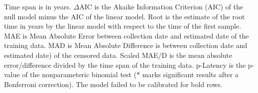 \documentclass[12pt]{article}
\begin{document}
\begin{sidewaystable}
	Time span is in years.
	$\Delta$AIC is the Akaike Information Criterion (AIC) \cite{Akaike74} of the null model minus the AIC of the linear model.
	Root is the estimate of the root time in years by the linear model with respect to the time of the first sample.
	MAE is Mean Absolute Error between collection date and estimated date of the training data.
	MAD is Mean Absolute Difference is between collection date and estimated date) of the censored data.
	Scaled MAE/D is the mean absolute error/difference divided by the time span of the training data.
	p-Latency is the p-value of the nonparameteric binomial test (* marks significant results after a Bonferroni correction).
	The model failed to be calibrated for bold rows.
\end{sidewaystable}

\pagebreak{}



\end{document}
